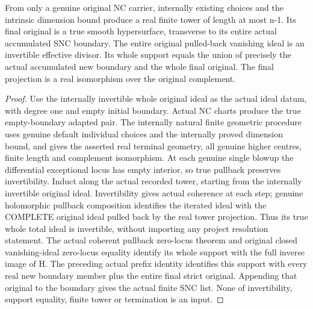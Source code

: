 \begin{theorem}
\label{hir:general-nc-natural-whole-total-divisor}
\leanok
From only a genuine original NC carrier, internally existing choices and the
intrinsic dimension bound produce a real finite tower of length at most n-1.
Its final original is a true smooth hypersurface, transverse to its entire
actual accumulated SNC boundary. The entire original pulled-back vanishing
ideal is an invertible effective divisor. Its whole support equals the union
of precisely the actual accumulated new boundary and the whole final original.
The final projection is a real isomorphism over the original complement.
\end{theorem}
\begin{proof}
Use the internally invertible whole original ideal as the actual ideal datum,
with degree one and empty initial boundary. Actual NC charts produce the true
empty-boundary adapted pair. The internally natural finite geometric procedure
uses genuine default individual choices and the internally proved dimension
bound, and gives the asserted real terminal geometry, all genuine higher
centres, finite length and complement isomorphism. At each genuine single blowup the differential exceptional locus has empty
interior, so true pullback preserves invertibility. Induct along the actual
recorded tower, starting from the internally invertible original ideal.
Invertibility gives actual coherence at each step; genuine holomorphic
pullback composition identifies the iterated ideal with the COMPLETE original
ideal pulled back by the real tower projection. Thus its true whole total
ideal is invertible, without importing any project resolution statement. The actual coherent pullback zero-locus theorem
and original closed vanishing-ideal zero-locus equality identify its whole
support with the full inverse image of H. The preceding actual prefix identity
identifies this support with every real new boundary member plus the entire
final strict original. Appending that original to the boundary gives the actual
finite SNC list. None of invertibility, support equality, finite tower or
termination is an input.
\end{proof}


